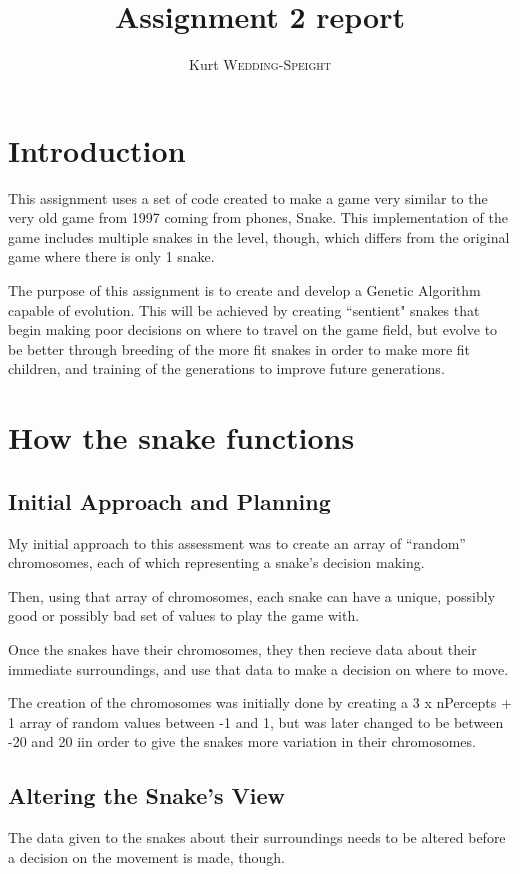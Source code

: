 \documentclass[12pt]{article}
\title{Assignment 2 report}
\author{Kurt \textsc{Wedding-Speight}}
\begin{document}
\maketitle

\section{Introduction}

This assignment uses a set of code created to make a game very similar to the very old game from 1997 coming from phones, Snake. This implementation of the game includes multiple snakes in the level, though, which differs from the original game where there is only 1 snake.

The purpose of this assignment is to create and develop a Genetic Algorithm capable of evolution. This will be achieved by creating ``sentient" snakes that begin making poor decisions on where to travel on the game field, but evolve to be better through breeding of the more fit snakes in order to make more fit children, and training of the generations to improve future generations.

\section{How the snake functions}

\subsection{Initial Approach and Planning}

My initial approach to this assessment was to create an array of ``random'' chromosomes, each of which representing a snake's decision making.

Then, using that array of chromosomes, each snake can have a unique, possibly good or possibly bad set of values to play the game with.

Once the snakes have their chromosomes, they then recieve data about their immediate surroundings, and use that data to make a decision on where to move.

The creation of the chromosomes was initially done by creating a 3 x nPercepts + 1 array of random values between -1 and 1, but was later changed to be between -20 and 20 iin order to give the snakes more variation in their chromosomes.

\subsection{Altering the Snake's View}
The data given to the snakes about their surroundings needs to be altered before a decision on the movement is made, though.
\end{document}
